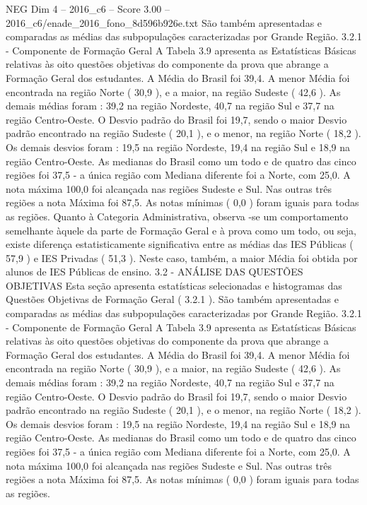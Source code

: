 \begin{textsample}{NEG Dim 4 – 2016\_c6 – Score 3.00 – 2016\_c6/enade\_2016\_fono\_8d596b926e.txt}
São também apresentadas e comparadas as médias das subpopulações caracterizadas por Grande Região. 3.2.1 - Componente de Formação Geral A Tabela 3.9 apresenta as Estatísticas Básicas relativas às oito questões objetivas do componente da prova que abrange a Formação Geral dos estudantes.
A Média do Brasil foi 39,4.
A menor Média foi encontrada na região Norte ( 30,9 ), e a maior, na região Sudeste ( 42,6 ).
As demais médias foram : 39,2 na região Nordeste, 40,7 na região Sul e 37,7 na região Centro-Oeste.
O Desvio padrão do Brasil foi 19,7, sendo o maior Desvio padrão encontrado na região Sudeste ( 20,1 ), e o menor, na região Norte ( 18,2 ).
Os demais desvios foram : 19,5 na região Nordeste, 19,4 na região Sul e 18,9 na região Centro-Oeste.
As medianas do Brasil como um todo e de quatro das cinco regiões foi 37,5 - a única região com Mediana diferente foi a Norte, com 25,0.
A nota máxima 100,0 foi alcançada nas regiões Sudeste e Sul.
Nas outras três regiões a nota Máxima foi 87,5.
As notas mínimas ( 0,0 ) foram iguais para todas as regiões.
Quanto à Categoria Administrativa, observa -se um comportamento semelhante àquele da parte de Formação Geral e à prova como um todo, ou seja, existe diferença estatisticamente significativa entre as médias das IES Públicas ( 57,9 ) e IES Privadas ( 51,3 ).
Neste caso, também, a maior Média foi obtida por alunos de IES Públicas de ensino. 3.2 - ANÁLISE DAS QUESTÕES OBJETIVAS Esta seção apresenta estatísticas selecionadas e histogramas das Questões Objetivas de Formação Geral ( 3.2.1 ).
São também apresentadas e comparadas as médias das subpopulações caracterizadas por Grande Região. 3.2.1 - Componente de Formação Geral A Tabela 3.9 apresenta as Estatísticas Básicas relativas às oito questões objetivas do componente da prova que abrange a Formação Geral dos estudantes.
A Média do Brasil foi 39,4.
A menor Média foi encontrada na região Norte ( 30,9 ), e a maior, na região Sudeste ( 42,6 ).
As demais médias foram : 39,2 na região Nordeste, 40,7 na região Sul e 37,7 na região Centro-Oeste.
O Desvio padrão do Brasil foi 19,7, sendo o maior Desvio padrão encontrado na região Sudeste ( 20,1 ), e o menor, na região Norte ( 18,2 ).
Os demais desvios foram : 19,5 na região Nordeste, 19,4 na região Sul e 18,9 na região Centro-Oeste.
As medianas do Brasil como um todo e de quatro das cinco regiões foi 37,5 - a única região com Mediana diferente foi a Norte, com 25,0.
A nota máxima 100,0 foi alcançada nas regiões Sudeste e Sul.
Nas outras três regiões a nota Máxima foi 87,5.
As notas mínimas ( 0,0 ) foram iguais para todas as regiões.

\end{textsample}
